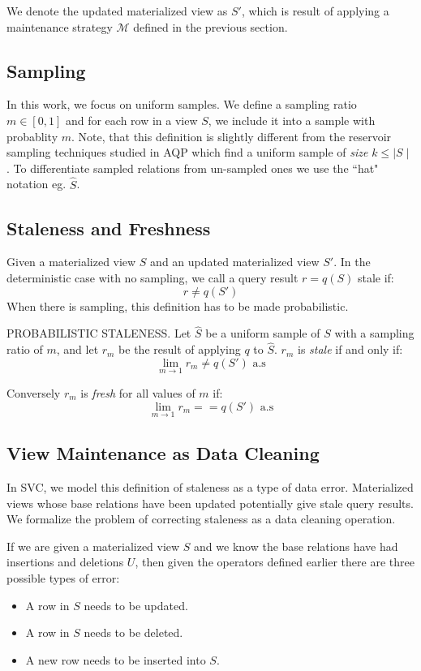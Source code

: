 We denote the updated materialized view as $S'$, which is result of applying a maintenance strategy $\mathcal{M}$ defined in the previous section.

\subsection{Sampling}
In this work, we focus on uniform samples.
We define a sampling ratio $m\in [0,1]$ and for each row in a view $S$, we include it into a sample with probablity $m$.
Note, that this definition is slightly different from the reservoir sampling techniques studied in AQP which find a uniform
sample of \emph{size} $k\le \mid S \mid$.
To differentiate sampled relations from un-sampled ones we use the ``hat" notation eg. $\hat{S}$.

\subsection{Staleness and Freshness}
Given a materialized view $S$ and an updated materialized view $S'$.
In the deterministic case with no sampling, we call a query result $r = q(S)$ stale if:
\[r \ne q(S')\]
When there is sampling, this definition has to be made probabilistic.
\begin{definition} PROBABILISTIC STALENESS.
Let $\hat{S}$ be a uniform sample of $S$ with a sampling ratio of $m$,
and let $r_m$ be the result of applying $q$ to $\hat{S}$.
$r_m$ is \emph{stale} if and only if:
\[\lim_{m\rightarrow 1} r_m \ne q(S') \text{  a.s}\]

Conversely $r_m$ is \emph{fresh} for all values of $m$ if:
\[\lim_{m\rightarrow 1} r_m == q(S') \text{  a.s}\]
\end{definition}

\subsection{View Maintenance as Data Cleaning}
In SVC, we model this definition of staleness as a type of data error.
Materialized views whose base relations have been updated potentially give stale query results.
We formalize the problem of correcting staleness as a data cleaning operation.

If we are given a materialized view $S$ and we know the base relations have had insertions and deletions $U$, then given the operators defined earlier there are three possible types of error:
\begin{itemize}
\item A row in $S$ needs to be updated.
\item A row in $S$ needs to be deleted.
\item A new row needs to be inserted into $S$.
\end{itemize}

